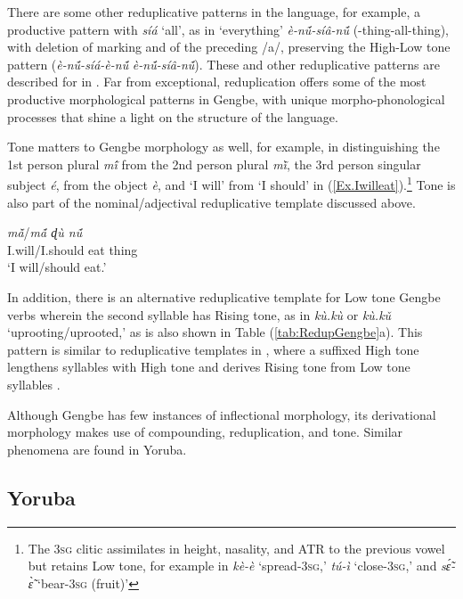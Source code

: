 \documentclass[output=paper,colorlinks,citecolor=brown]{langscibook}
\begin{document}
There are some other reduplicative  patterns in the language, for example, a productive pattern with \textit{síá} ‘all', as in ‘everything’ \textit{è-nṹ-síâ-nṹ} (-thing-all-thing), with deletion of  marking and  of the preceding /a/, preserving the High-Low tone pattern (\textit{è-nṹ-síá-è-nṹ} \rightarrow \textit{è-nṹ-síâ-nṹ}). These and other reduplicative patterns are described for  in \citet{Ameka1999}. Far from exceptional, reduplication offers some of the most productive morphological patterns in Gengbe, with unique morpho-phonological processes that shine a light on the structure of the language. 

Tone matters to Gengbe morphology as well, for example, in distinguishing the 1st person plural \textit{mĩ́} from the 2nd person plural \textit{mĩ̀}, the 3rd person singular subject \textit{é}, from the object \textit{è}, and ‘I will’ from ‘I should’ in (\ref{Ex.Iwilleat}).\footnote{The \textsc {3sg} clitic assimilates in height, nasality, and ATR to the previous vowel but retains Low tone, for example in \textit{kè-è} `spread-\textsc{3sg},' \textit{tú-ì} `close-\textsc{3sg},' and \textit{sɛ̃́-ɛ̃̀} `bear-\textsc{3sg} (fruit)'} Tone is also part of the nominal/adjectival reduplicative template discussed above.

\ea \label{Ex.Iwilleat}
\gll \textit{mã̌}/\textit{mã́ ɖù nṹ}\\
I.will/I.should eat thing\\
\glt  ‘I will/should eat.’
\z

In addition, there is an alternative reduplicative template for Low tone Gengbe verbs wherein the second syllable has Rising tone, as in \textit{kù.kù} or \textit{kù.kǔ} ‘uprooting/uprooted,’ as is also shown in Table (\ref{tab:RedupGengbe}a). This pattern is similar to reduplicative templates in , where a suffixed High tone lengthens syllables with High tone and derives Rising tone from Low tone syllables \citep{Ameka2012}.

Although Gengbe has few instances of inflectional morphology, its derivational morphology makes use of compounding, reduplication, and tone. Similar phenomena are found in Yoruba.

\subsection{Yoruba}
\end{document}
